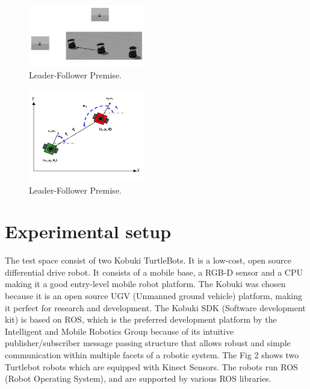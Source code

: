 \documentclass[journal]{IEEEtran}
\begin{document}
\begin{enumerate}
\begin{figure}[!h]
\begin{center}
\includegraphics[width=2in]{1.jpeg}
\caption{Leader-Follower Premise.}
\end{center}
\label{fig:mypicture2}
\end{figure}



\begin{figure}[!h]
\begin{center}
\includegraphics[width=2in]{7.png}
\caption{Leader-Follower Premise.}
\end{center}
\label{fig:mypicture2}
\end{figure}


\end{enumerate}


\section{Experimental setup}

The test space consist of two Kobuki TurtleBots. It is a low-cost, open source differential drive robot. It consists of a mobile base, a RGB-D sensor and a CPU making it a good  entry-level mobile robot platform. The Kobuki was chosen because it is an open source UGV (Unmanned ground vehicle) platform, making it perfect for research and development. The Kobuki SDK (Software development kit) is based on ROS, which is the preferred development platform by the Intelligent and Mobile Robotics Group because of its intuitive publisher/subscriber message passing structure that allows robust and simple communication within multiple  facets of a robotic system. The Fig 2 shows two Turtlebot robots which are equipped with Kinect Sensors. The robots run ROS (Robot Operating System), and are supported by various ROS libraries. 
\end{document}
